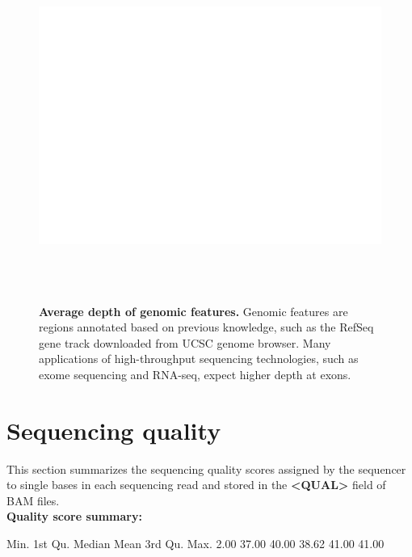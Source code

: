 \documentclass{article}
\begin{document}
\begin{center}
\begin{figure}[H]
\includegraphics[width=6.5in, height=4.5in, page=2]{bamchop-depth-feature}
\caption{\textbf{Average depth of genomic features.} Genomic features are regions annotated based on previous knowledge, such as the RefSeq gene track downloaded from UCSC genome browser. Many applications of high-throughput sequencing technologies, such as exome sequencing and RNA-seq, expect higher depth at exons.}
\end{figure}
\end{center}

\pagebreak

\section{Sequencing quality}
This section summarizes the sequencing quality scores assigned by the sequencer to single bases in each sequencing read and stored in the \textbf{<QUAL>} field of BAM files.
\vspace*{1\baselineskip}
\\{\textbf{Quality score summary:}}
\begin{Schunk}
\begin{Soutput}
   Min. 1st Qu.  Median    Mean 3rd Qu.    Max. 
   2.00   37.00   40.00   38.62   41.00   41.00 
\end{Soutput}
\end{Schunk}
\end{document}
